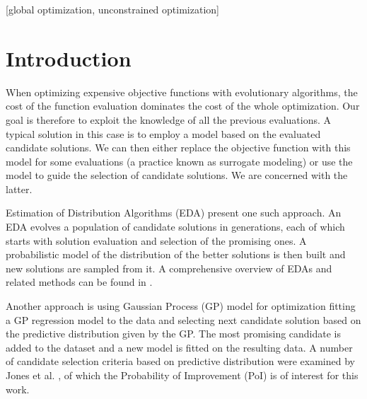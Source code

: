 \documentclass{sig-alternate}
\begin{document}
\maketitle
\begin{abstract}
Model Guided Sampling Optimization (MGSO) is a novel expensive black-box
optimization method based on a combination of ideas from Estimation of 
Distribution Algorithms and global optimization methods using Gaussian 
Processes. The algorithm is described and its implementation tested on 
three benchmark functions as a proof of concept.
\end{abstract}

[global optimization,
unconstrained optimization]


\section{Introduction}

When optimizing expensive objective functions with evolutionary algorithms, the cost of the function 
evaluation dominates the cost of the whole optimization. Our goal is therefore to exploit the knowledge 
of all the previous evaluations. A typical solution in this case is to employ a model based on the evaluated 
candidate solutions. We can then either replace the objective function  with this model for some 
evaluations (a practice known as surrogate modeling) or use the model to guide the selection of candidate 
solutions. We are concerned with the latter.

Estimation of Distribution Algorithms (EDA) present one such approach. An EDA evolves a population of 
candidate solutions in generations, each of which starts with solution evaluation and selection of the
promising ones. A probabilistic model of the distribution of the better solutions is then built and new 
solutions are sampled from it. A comprehensive overview of EDAs and related methods can be found in \cite{pelikan2006scalable}.

Another approach is using Gaussian Process (GP) model for optimization fitting a GP regression model to the 
data and selecting next candidate solution based on the predictive distribution given by the GP. The most 
promising candidate is added to the dataset and a new model is fitted on the resulting data. A number of candidate 
selection criteria based on predictive distribution were examined by Jones et al. \cite{jones01taxonomy}, 
of which the Probability of Improvement (PoI) is of interest for this work.
\end{document}
